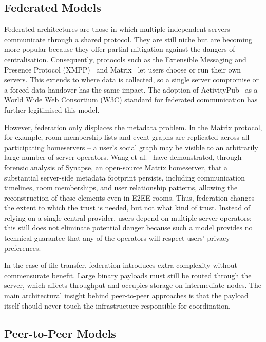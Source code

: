 \documentclass[12pt,a4paper,oneside]{report}
\begin{document}
\subsection{Federated Models}
\label{sec:federated}

Federated architectures are those in which multiple independent servers communicate through a shared protocol. They are still niche but are becoming more popular because they offer partial mitigation against the dangers of centralisation. Consequently, protocols such as the Extensible Messaging and Presence Protocol (XMPP)~\cite{rfc6120} and Matrix~\cite{matrix} let users choose or run their own servers. This extends to where data is collected, so a single server compromise or a forced data handover has the same impact. The adoption of ActivityPub~\cite{activitypub} as a World Wide Web Consortium (W3C) standard for federated communication has further legitimised this model.

However, federation only displaces the metadata problem. In the Matrix protocol, for example, room membership lists and event graphs are replicated across all participating homeservers -- a user's social graph may be visible to an arbitrarily large number of server operators. Wang et al.~\cite{wang2026} have demonstrated, through forensic analysis of Synapse, an open-source Matrix homeserver, that a substantial server-side metadata footprint persists, including communication timelines, room memberships, and user relationship patterns, allowing the reconstruction of these elements even in E2EE rooms. Thus, federation changes the extent to which the trust is needed, but not what kind of trust. Instead of relying on a single central provider, users depend on multiple server operators; this still does not eliminate potential danger because such a model provides no technical guarantee that any of the operators will respect users' privacy preferences.

In the case of file transfer, federation introduces extra complexity without commensurate benefit. Large binary payloads must still be routed through the server, which affects throughput and occupies storage on intermediate nodes. The main architectural insight behind peer-to-peer approaches is that the payload itself should never touch the infrastructure responsible for coordination.


\subsection{Peer-to-Peer Models}
\label{sec:p2p}
\end{document}
